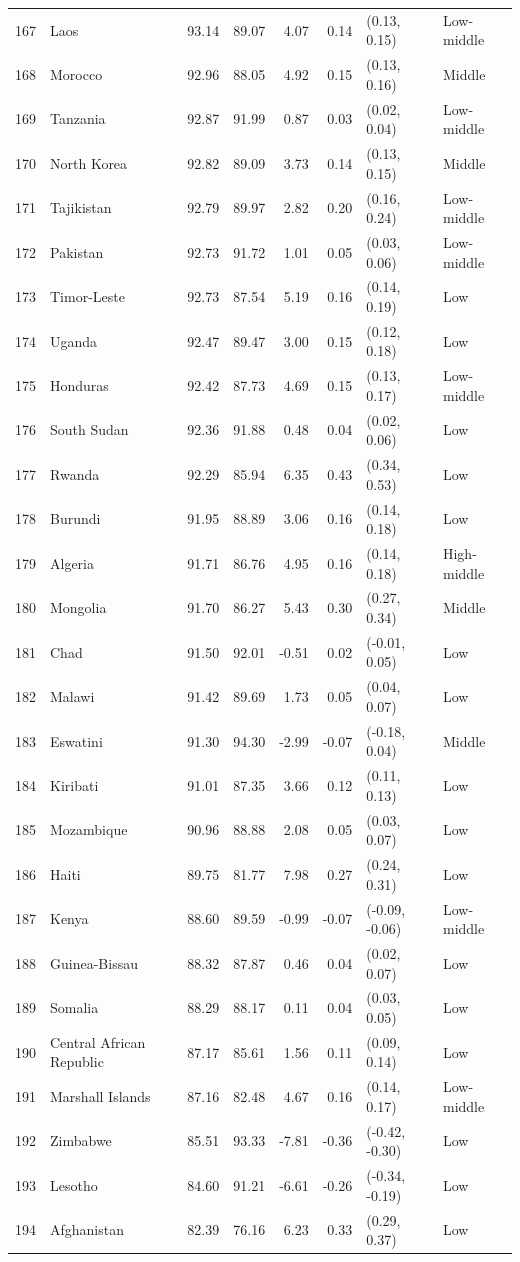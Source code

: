 \begin{longtable}{r l r r r r l l}
167 & Laos & 93.14 & 89.07 & 4.07 & 0.14 & (0.13, 0.15) & Low-middle \\
168 & Morocco & 92.96 & 88.05 & 4.92 & 0.15 & (0.13, 0.16) & Middle \\
169 & Tanzania & 92.87 & 91.99 & 0.87 & 0.03 & (0.02, 0.04) & Low-middle \\
170 & North Korea & 92.82 & 89.09 & 3.73 & 0.14 & (0.13, 0.15) & Middle \\
171 & Tajikistan & 92.79 & 89.97 & 2.82 & 0.20 & (0.16, 0.24) & Low-middle \\
172 & Pakistan & 92.73 & 91.72 & 1.01 & 0.05 & (0.03, 0.06) & Low-middle \\
173 & Timor-Leste & 92.73 & 87.54 & 5.19 & 0.16 & (0.14, 0.19) & Low \\
174 & Uganda & 92.47 & 89.47 & 3.00 & 0.15 & (0.12, 0.18) & Low \\
175 & Honduras & 92.42 & 87.73 & 4.69 & 0.15 & (0.13, 0.17) & Low-middle \\
176 & South Sudan & 92.36 & 91.88 & 0.48 & 0.04 & (0.02, 0.06) & Low \\
177 & Rwanda & 92.29 & 85.94 & 6.35 & 0.43 & (0.34, 0.53) & Low \\
178 & Burundi & 91.95 & 88.89 & 3.06 & 0.16 & (0.14, 0.18) & Low \\
179 & Algeria & 91.71 & 86.76 & 4.95 & 0.16 & (0.14, 0.18) & High-middle \\
180 & Mongolia & 91.70 & 86.27 & 5.43 & 0.30 & (0.27, 0.34) & Middle \\
181 & Chad & 91.50 & 92.01 & -0.51 & 0.02 & (-0.01, 0.05) & Low \\
182 & Malawi & 91.42 & 89.69 & 1.73 & 0.05 & (0.04, 0.07) & Low \\
183 & Eswatini & 91.30 & 94.30 & -2.99 & -0.07 & (-0.18, 0.04) & Middle \\
184 & Kiribati & 91.01 & 87.35 & 3.66 & 0.12 & (0.11, 0.13) & Low \\
185 & Mozambique & 90.96 & 88.88 & 2.08 & 0.05 & (0.03, 0.07) & Low \\
186 & Haiti & 89.75 & 81.77 & 7.98 & 0.27 & (0.24, 0.31) & Low \\
187 & Kenya & 88.60 & 89.59 & -0.99 & -0.07 & (-0.09, -0.06) & Low-middle \\
188 & Guinea-Bissau & 88.32 & 87.87 & 0.46 & 0.04 & (0.02, 0.07) & Low \\
189 & Somalia & 88.29 & 88.17 & 0.11 & 0.04 & (0.03, 0.05) & Low \\
190 & Central African Republic & 87.17 & 85.61 & 1.56 & 0.11 & (0.09, 0.14) & Low \\
191 & Marshall Islands & 87.16 & 82.48 & 4.67 & 0.16 & (0.14, 0.17) & Low-middle \\
192 & Zimbabwe & 85.51 & 93.33 & -7.81 & -0.36 & (-0.42, -0.30) & Low \\
193 & Lesotho & 84.60 & 91.21 & -6.61 & -0.26 & (-0.34, -0.19) & Low \\
194 & Afghanistan & 82.39 & 76.16 & 6.23 & 0.33 & (0.29, 0.37) & Low \\

\end{longtable}
